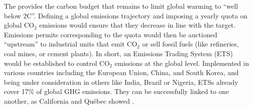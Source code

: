 \documentclass[12pt,english]{article}
\begin{document}
The \citet{ipcc_climate_2021} provides the carbon budget that remains to limit global warming to ``well below 2\textdegree{}C''. 
Defining a global emissions trajectory and imposing a yearly quota on global CO$_\text{2}$ emissions would ensure that they decrease in line with the target. 
Emissions permits corresponding to the quota would then be auctioned ``upstream'' to industrial units that emit CO$_\text{2}$ or sell fossil fuels (like refineries, coal mines, or cement plants). 
In short, an Emissions Trading System (ETS) would be established to control CO$_\text{2}$ emissions at the global level. 
Implemented in various countries including the European Union, China, and South Korea, and being under consideration in others like India, Brazil or Nigeria, ETSs already cover 17\% of global GHG emissions. They can be successfully linked to one another, as California and Québec showed \citep{icap_emissions_2023}. 
\end{document}
